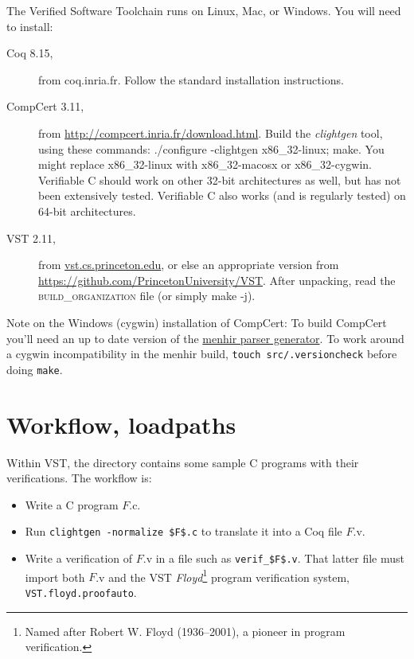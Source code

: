 \documentclass[12pt,fleqn,openany,oneside,showtrims]{memoir}
\newcommand\vstversion{2.11}
\newcommand\coqversion{8.15}
\newcommand\compcertversion{3.11}
\begin{document}
The Verified Software Toolchain runs on Linux, Mac, or Windows.
You will need to install:

\begin{description}
\item[Coq \coqversion{},] from coq.inria.fr.  Follow the standard installation instructions.
\item[CompCert \compcertversion{},] from \href{http://compcert.inria.fr/download.html}{http://compcert.inria.fr/download.html}.
  Build the \emph{clightgen} tool, using these commands:
  \textsf{./configure -clightgen x86\_32-linux; make}.  You might replace
  x86\_32-linux with x86\_32-macosx or x86\_32-cygwin.  Verifiable C should work
  on other 32-bit architectures as well, but has not been extensively tested.
  Verifiable C also works (and is regularly tested) on 64-bit architectures.
\item[VST \vstversion{},] from \href{vst.cs.princeton.edu}{vst.cs.princeton.edu},
  or else an appropriate
  version from \href{https://github.com/PrincetonUniversity/VST}{https://github.com/PrincetonUniversity/VST}.
  After unpacking, read the \textsc{build\_organization} file
  (or simply \textsf{make -j}).
\end{description}

{\small
  Note on the Windows (cygwin) installation of CompCert:
  To build CompCert you'll need an up to date version of the
  \href{http://gallium.inria.fr/~fpottier/menhir/}{menhir parser generator}.
  To work around a cygwin incompatibility in the menhir build,
  \lstinline{touch src/.versioncheck} before doing \lstinline{make}.}

\chapter{Workflow, loadpaths}
\label{refman:workflow}
Within VST, the  directory contains some sample C programs
with their verifications.  The workflow is:
\begin{itemize}
\item Write a C program $F$.c.
\item Run \lstinline{clightgen -normalize $F$.c} to translate it into a Coq
file $F$.v.
\item Write a verification of $F$.v in a file such as
\lstinline{verif_$F$.v}.  That latter file must import
both $F$.v and the VST \emph{Floyd}\footnote{Named after Robert W. Floyd (1936--2001), a pioneer in program verification.} program verification system,
\lstinline{VST.floyd.proofauto}.
\end{itemize}
\end{document}
